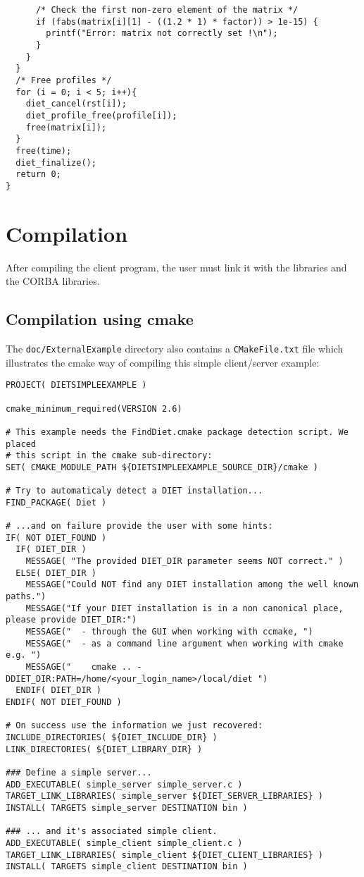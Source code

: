 {\begin{verbatim}
      /* Check the first non-zero element of the matrix */
      if (fabs(matrix[i][1] - ((1.2 * 1) * factor)) > 1e-15) {
        printf("Error: matrix not correctly set !\n");
      }
    }
  }
  /* Free profiles */
  for (i = 0; i < 5; i++){
    diet_cancel(rst[i]);
    diet_profile_free(profile[i]);
    free(matrix[i]);
  }
  free(time);
  diet_finalize();
  return 0;
}
\end{verbatim}
}

\section{Compilation}
\label{sec:cl_comp}

After compiling the client program, the user must link it with the
\diet libraries and the CORBA libraries.

\subsection{Compilation using cmake}

The \texttt{doc/ExternalExample} directory also contains a
\texttt{CMakeFile.txt} file which illustrates the cmake way of compiling
this simple client/server example:
{\footnotesize
\begin{verbatim}
PROJECT( DIETSIMPLEEXAMPLE )

cmake_minimum_required(VERSION 2.6)

# This example needs the FindDiet.cmake package detection script. We placed
# this script in the cmake sub-directory:
SET( CMAKE_MODULE_PATH ${DIETSIMPLEEXAMPLE_SOURCE_DIR}/cmake )

# Try to automaticaly detect a DIET installation...
FIND_PACKAGE( Diet )

# ...and on failure provide the user with some hints:
IF( NOT DIET_FOUND )
  IF( DIET_DIR ) 
    MESSAGE( "The provided DIET_DIR parameter seems NOT correct." )
  ELSE( DIET_DIR ) 
    MESSAGE("Could NOT find any DIET installation among the well known paths.")
    MESSAGE("If your DIET installation is in a non canonical place, please provide DIET_DIR:")
    MESSAGE("  - through the GUI when working with ccmake, ")
    MESSAGE("  - as a command line argument when working with cmake e.g. ")
    MESSAGE("    cmake .. -DDIET_DIR:PATH=/home/<your_login_name>/local/diet ")
  ENDIF( DIET_DIR ) 
ENDIF( NOT DIET_FOUND )

# On success use the information we just recovered: 
INCLUDE_DIRECTORIES( ${DIET_INCLUDE_DIR} )
LINK_DIRECTORIES( ${DIET_LIBRARY_DIR} )

### Define a simple server...
ADD_EXECUTABLE( simple_server simple_server.c )
TARGET_LINK_LIBRARIES( simple_server ${DIET_SERVER_LIBRARIES} )
INSTALL( TARGETS simple_server DESTINATION bin )

### ... and it's associated simple client.
ADD_EXECUTABLE( simple_client simple_client.c )
TARGET_LINK_LIBRARIES( simple_client ${DIET_CLIENT_LIBRARIES} )
INSTALL( TARGETS simple_client DESTINATION bin )
\end{verbatim}
}

